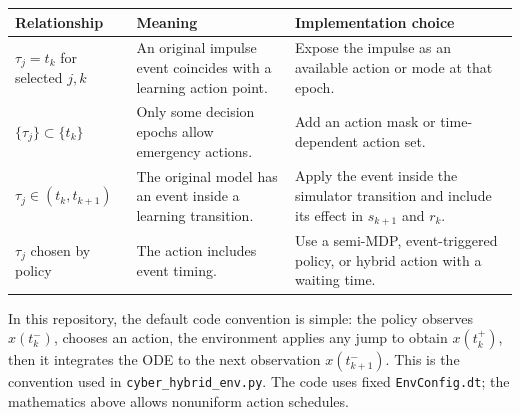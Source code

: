 \documentclass[11pt,a4paper]{article}
\begin{document}
\begin{longtable}{p{}p{}p{}}
\toprule
Relationship & Meaning & Implementation choice \\
\midrule
$\tau_j=t_k$ for selected $j,k$ & An original impulse event coincides with a learning action point. & Expose the impulse as an available action or mode at that epoch. \\
$\{\tau_j\}\subset\{t_k\}$ & Only some decision epochs allow emergency actions. & Add an action mask or time-dependent action set. \\
$\tau_j\in(t_k,t_{k+1})$ & The original model has an event inside a learning transition. & Apply the event inside the simulator transition and include its effect in $s_{k+1}$ and $r_k$. \\
$\tau_j$ chosen by policy & The action includes event timing. & Use a semi-MDP, event-triggered policy, or hybrid action with a waiting time. \\
\bottomrule
\end{longtable}

In this repository, the default code convention is simple: the policy observes $x(t_k^-)$, chooses an action, the environment applies any jump to obtain $x(t_k^+)$, then it integrates the ODE to the next observation $x(t_{k+1}^-)$. This is the convention used in \texttt{cyber\_hybrid\_env.py}. The code uses fixed \texttt{EnvConfig.dt}; the mathematics above allows nonuniform action schedules.
\end{document}
